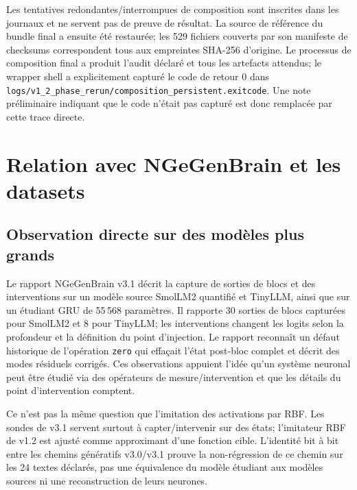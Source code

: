 \documentclass[11pt,a4paper,oneside]{report}
\begin{document}
Les tentatives redondantes/interrompues de composition sont inscrites dans les journaux et ne servent pas de preuve de résultat. La source de référence du bundle final a ensuite été restaurée; les 529 fichiers couverts par son manifeste de checksums correspondent tous aux empreintes SHA-256 d'origine. Le processus de composition final a produit l’audit déclaré et tous les artefacts attendus; le wrapper shell a explicitement capturé le code de retour 0 dans \texttt{logs/v1\_2\_phase\_rerun/composition\_persistent.exitcode}. Une note préliminaire indiquant que le code n’était pas capturé est donc remplacée par cette trace directe.

\chapter{Relation avec NGeGenBrain et les datasets}
\section{Observation directe sur des modèles plus grands}
Le rapport NGeGenBrain v3.1 décrit la capture de sorties de blocs et des interventions sur un modèle source SmolLM2 quantifié et TinyLLM, ainsi que sur un étudiant GRU de 55\,568 paramètres. Il rapporte 30 sorties de blocs capturées pour SmolLM2 et 8 pour TinyLLM; les interventions changent les logits selon la profondeur et la définition du point d'injection. Le rapport reconnaît un défaut historique de l'opération \texttt{zero} qui effaçait l'état post-bloc complet et décrit des modes résiduels corrigés. Ces observations appuient l'idée qu'un système neuronal peut être étudié via des opérateurs de mesure/intervention et que les détails du point d'intervention comptent.

Ce n'est pas la même question que l'imitation des activations par RBF. Les sondes de v3.1 servent surtout à capter/intervenir sur des états; l'imitateur RBF de v1.2 est ajusté comme approximant d'une fonction cible. L'identité bit à bit entre les chemins génératifs v3.0/v3.1 prouve la non-régression de ce chemin sur les 24 textes déclarés, pas une équivalence du modèle étudiant aux modèles sources ni une reconstruction de leurs neurones.
\end{document}
